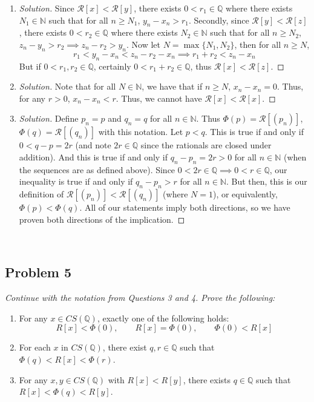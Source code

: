 \documentclass{article}
\newcommand{\N}{{\mathbb N}}
\newcommand{\Q}{{\mathbb Q}}
\newcommand{\SR}{{\mathcal R}}
\begin{document}
\begin{enumerate}
\begin{proof}[Solution]
		Now assume $\SR[x] < \SR[y]$.
		Note that we can do an identical proof as before,
		just swapping the $x$'s and $x'$'s and the $y$'s with $y'$'s,
		to show that this implies $\SR[x'] < \SR[y']$.
		Thus, we have shown both directions of the implication.
	\end{proof}
	\item \begin{proof}[Solution]\let\qed\relax
		Since $\SR[x] < \SR[y]$,
		there exists $0 < r_1 \in \Q$ where there exists $N_1 \in \N$
		such that for all $n\geq N_1$,
		$y_n - x_n > r_1$.
		Secondly, since $\SR[y] < \SR[z]$,
		there exists $0 < r_2 \in \Q$ where there exists $N_2 \in \N$
		such that for all $n\geq N_2$,
		$z_n - y_n > r_2 \implies z_n - r_2 > y_n$.
		Now let $N = \max\{N_1,N_2\}$,
		then for all $n \geq N$,
		\[
			r_1 < y_n - x_n < z_n - r_2 - x_n \implies
			r_1 + r_2 < z_n - x_n
		\]
		But if $0 < r_1,r_2 \in \Q$, certainly $0 < r_1 + r_2 \in \Q$,
		thus $\SR[x] < \SR[z]$.
	\end{proof}
	\item \begin{proof}[Solution]\let\qed\relax
		Note that for all $N \in \N$,
		we have that if $n \geq N$,
		$x_n - x_n = 0$.
		Thus, for any $r > 0$, $x_n - x_n < r$.
		Thus, we cannot have $\SR[x] < \SR[x]$.
	\end{proof}
	\item \begin{proof}[Solution]\let\qed\relax
		Define $p_n = p$ and $q_n = q$ for all $n \in \N$.
		Thus $\Phi(p) = \SR[(p_n)]$, $\Phi(q) = \SR[(q_n)]$ with this notation.
		Let $p < q$.
		This is true if and only if $0 < q - p = 2r$
		(and note $2r \in \Q$ since the rationals are closed under addition).
		And this is true if and only if
		$q_n - p_n = 2r > 0$ for all $n \in \N$ (when the sequences are as defined above).
		Since $0 < 2r \in \Q \implies 0< r \in \Q$,
		our inequality is true if and only if
		$q_n - p_n > r$ for all $n \in \N$.
		But then, this is our definition of $\SR[(p_n)] < \SR[(q_n)]$
		(where $N = 1$),
		or equivalently,
		$\Phi(p) < \Phi(q)$.
		All of our statements imply both directions,
		so we have proven both directions of the implication.
	\end{proof}
\end{enumerate}
\clearpage
~\clearpage

\subsection*{Problem 5}
{\it Continue with the notation from Questions 3 and 4. Prove the following:
\begin{enumerate}
	\item For any $x \in CS(\Q)$, exactly one of the following holds:
		\[
			R[x] < \Phi(0), \qquad R[x] = \Phi(0), \qquad \Phi(0) < R[x]
		\]
	\item For each $x$ in $CS(\Q)$, there exist $q,r\in\Q$
		such that $\Phi(q) < R[x] < \Phi(r)$.
	\item For any $x,y \in CS(\Q)$ with $R[x] < R[y]$,
		there exists $q \in \Q$ such that $R[x] < \Phi(q) < R[y]$.
\end{enumerate}}
\end{document}
